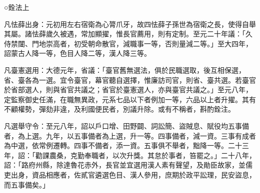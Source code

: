 
\begin{pinyinscope}

 ○銓法上



 凡怯薛出身：元初用左右宿衛為心膂爪牙，故四怯薛子孫世為宿衛之長，使得自舉其屬。諸怯薛歲久被遇，常加顯擢，惟長官薦用，則有定制。至元二十年議：「久侍禁闥、門地崇高者，初受朝命散官，減職事一等，否則量減二等。」至大四年，詔蒙古人降一等，色目人降二等，漢人降三等。



 凡臺憲選用：大德元年，省議：「臺官舊無選法，俱於民職選取，後互相保選，省、臺各為一選。宜令臺官，幕官聽自選擇，惟廉訪司官，則省、臺共選。若臺官於省部選人，則與省官共議之；省官於臺憲選人，亦與臺官共議之。」至元八年，定監察御史任滿，在職無異政，元系七品以下者例加一等，六品以上者升擢。其有不顧權勢，彈劾非違，及利國便民者，別議升除。或有不稱者，斟酌銓注。



 凡選舉守令：至元八年，詔以戶口增、田野闢、詞訟簡、盜賊息、賦役均五事備者，為上選。九年，以五事備者為上選，升一等。四事備者，減一資。三事有成者為中選，依常例遷轉。四事不備者，添一資。五事俱不舉者，黜降一等。二十三年，詔：「勸課農桑，克勤奉職者，以次升獎。其怠於事者，笞罷之。」二十八年，詔：「路府州縣，除達魯花赤外，長官並宜選用漢人素有聲望，及勛臣故家，並儒吏出身，資品相應者，佐貳官遴選色目、漢人參用，庶期於政平訟理，民安盜息，而五事備矣。」




\end{pinyinscope}
